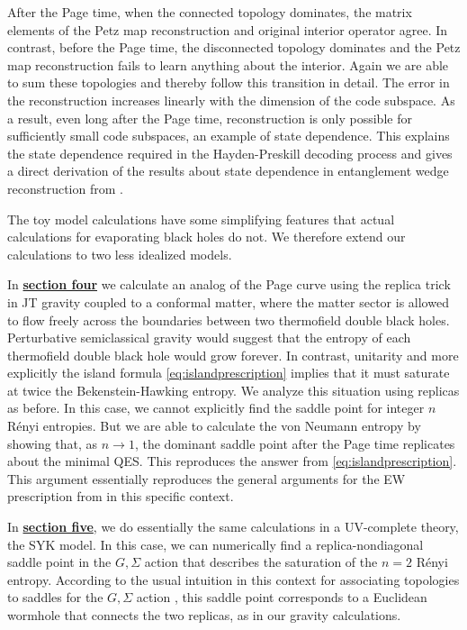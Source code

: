 \documentclass[12pt]{article}
\numberwithin{equation}{section}
\begin{document}
After the Page time, when the connected topology dominates,  the matrix elements of the Petz map reconstruction and original interior operator agree. In contrast, before the Page time, the disconnected topology dominates and the Petz map reconstruction fails to learn anything about the interior. Again we are able to sum these topologies and thereby follow this transition in detail. The error in the reconstruction increases linearly with the dimension of the code subspace. As a result, even long after the Page time, reconstruction is only possible for sufficiently small code subspaces, an example of state dependence. This explains the state dependence required in the Hayden-Preskill decoding process \cite{Hayden:2007cs} and gives a direct derivation of the results about state dependence in entanglement wedge reconstruction from \cite{Hayden:2018khn}.



The toy model calculations have some simplifying features that actual calculations for evaporating black holes do not.  We therefore extend our calculations to two less idealized models.  

 In \hyperref[sec:JT]{{\bf section four}} we calculate an analog of the Page curve using the replica trick in JT gravity coupled to a conformal matter, where the matter sector is allowed to flow freely across the boundaries between two thermofield double black holes.   Perturbative semiclassical gravity would suggest that the entropy of each thermofield double black hole would grow forever.   In contrast, unitarity and more explicitly the island formula  \eqref{eq:islandprescription} implies  that it must saturate at twice the Bekenstein-Hawking entropy.  We analyze this situation using replicas as before.   In this case, we cannot explicitly find the saddle point for integer  $n$ R\'{e}nyi entropies.  But we are able to  calculate the von Neumann entropy by showing that, as  $n \to 1$, the dominant saddle point after the Page time replicates about the minimal QES.  This  reproduces the answer from \eqref{eq:islandprescription}. This argument essentially reproduces the general arguments for the EW prescription from \cite{Dong:2017xht} in this specific context.

In \hyperref[sec:SYK]{{\bf section five}}, we do essentially the same calculations in a UV-complete theory, the SYK model. In this case, we can numerically find a replica-nondiagonal saddle point in the $G,\Sigma$ action that describes the saturation of the $n=2$ R\'{e}nyi entropy. According to the usual intuition in this context  for associating topologies to saddles for the  $G,\Sigma$ action
 \cite{Saad:2018bqo}, this saddle point corresponds to a Euclidean wormhole that connects the two replicas, as in our gravity calculations. 
\end{document}
